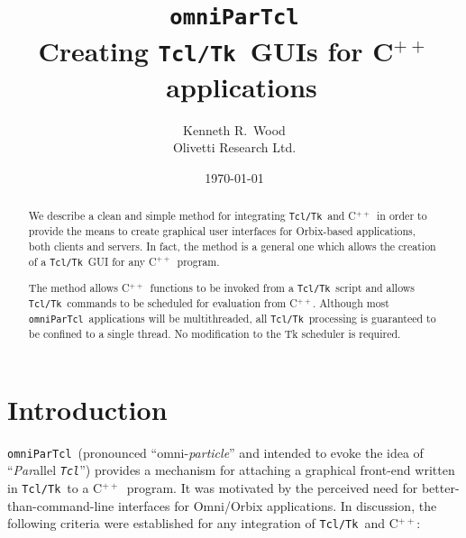 \documentclass[11pt]{article}
\def\omniParTcl{{\tt omniParTcl}}
\def\tcltk{{\tt Tcl/Tk}}
\def\tcl{{\tt Tcl}}
\def\CXX{\relax C$^{++}$\relax}
\begin{document}
  
\title{{\bf \omniParTcl}\\
       {\normalsize Creating \tcltk\ GUIs for \CXX\ applications}}
\author{Kenneth R.\ Wood\\
        Olivetti Research Ltd.}
\date{\today} 
\maketitle

\begin{abstract}
\noindent
We describe a clean and simple method for integrating \tcltk\ and \CXX\
in order to provide the means to create graphical user interfaces for
Orbix-based applications, both clients and servers.  In fact, the method
is a general one which allows the creation of a \tcltk\ GUI for any \CXX\
program.

The method allows \CXX\ functions to be invoked from a \tcltk\ script and
allows \tcltk\ commands to be scheduled for evaluation from \CXX.  
Although most \omniParTcl\ applications will be multithreaded,
all \tcltk\ processing is guaranteed to be confined to a single thread.
No modification to the Tk scheduler is required.
\end{abstract}

\section{Introduction}

\omniParTcl\ (pronounced ``omni-{\em particle}'' and intended to
evoke the idea of ``{\em Par\/}allel {\em \tcl\/}'') provides a mechanism
for attaching a graphical front-end written in \tcltk\ to a \CXX\
program.  It was motivated by the perceived need for
better-than-command-line interfaces for Omni/Orbix applications.  In
discussion, the following criteria were established for any integration
of \tcltk\ and \CXX:
\end{document}
